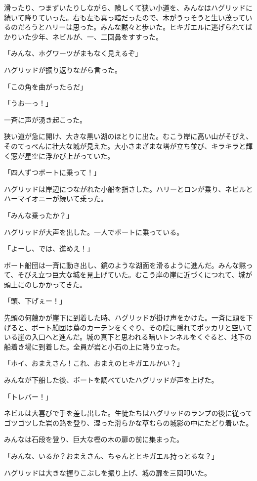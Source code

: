 \documentclass[10pt,a4paper]{article}
\begin{document}
\begin{CJK}{UTF8}{min}
滑ったり、つまずいたりしながら、険しくて狭い小道を、みんなはハグリッドに続いて降りていった。右も左も真っ暗だったので、木がうっそうと生い茂っているのだろうとハリーは思った。みんな黙々と歩いた。ヒキガエルに逃げられてばかりいた少年、ネビルが、一、二回鼻をすすった。

「みんな、ホグワーツがまもなく見えるぞ」

ハグリッドが振り返りながら言った。

「この角を曲がったらだ」

「うお一っ！」

一斉に声が湧き起こった。

狭い道が急に開け、大きな黒い湖のほとりに出た。むこう岸に高い山がそびえ、そのてっぺんに壮大な城が見えた。大小さまざまな塔が立ち並び、キラキラと輝く窓が星空に浮かび上がっていた。

「四人ずつボートに乗って！」

ハグリッドは岸辺につながれた小船を指さした。ハリーとロンが乗り、ネビルとハーマイオニーが続いて乗った。

「みんな乗ったか？」

ハグリッドが大声を出した。一人でボートに乗っている。

「よーし、では、進めえ！」

ボート船団は一斉に動き出し、鏡のような湖面を滑るように進んだ。みんな黙って、そびえ立つ巨大な城を見上げていた。むこう岸の崖に近づくにつれて、城が頭上にのしかかってきた。

「頭、下げぇー！」

先頭の何艘かが崖下に到着した時、ハグリッドが掛け声をかけた。一斉に頭を下げると、ボート船団は蔦のカーテンをくぐり、その陰に隠れてポッカリと空いている崖の入口へと進んだ。城の真下と思われる暗いトンネルをくぐると、地下の船着き場に到着した。全員が岩と小石の上に降り立った。

「ホイ、おまえさん！これ、おまえのヒキガエルかい？」

みんなが下船した後、ボートを調べていたハグリッドが声を上げた。

「トレバー！」

ネビルは大喜びで手を差し出した。生徒たちはハグリッドのランプの後に従ってゴツゴツした岩の路を登り、湿った滑らかな草むらの城影の中にたどり着いた。

みんなは石段を登り、巨大な樫の木の扉の前に集まった。

「みんな、いるか？おまえさん、ちゃんとヒキガエル持っとるな？」

ハグリッドは大きな握りこぶしを振り上げ、城の扉を三回叩いた。





\end{CJK}
\end{document}

